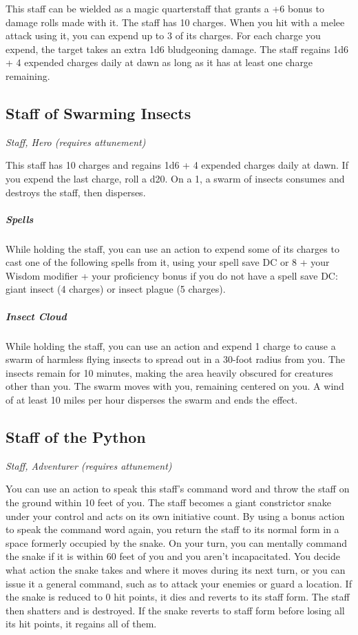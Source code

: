 This staff can be wielded as a magic quarterstaff that grants a +6 bonus to damage rolls made with it.  The staff has 10 charges. When you hit with a melee attack using it, you can expend up to 3 of its charges. For each charge you expend, the target takes an extra 1d6 bludgeoning damage. The staff regains 1d6 + 4 expended charges daily at dawn as long as it has at least one charge remaining.

\subsection{Staff of Swarming Insects}
\textit{Staff, Hero (requires attunement)}

This staff has 10 charges and regains 1d6 + 4 expended charges daily at dawn. If you expend the last charge, roll a d20. On a 1, a swarm of insects consumes and destroys the staff, then disperses.

\subparagraph*{Spells} While holding the staff, you can use an action to expend some of its charges to cast one of the following spells from it, using your spell save DC or 8 + your Wisdom modifier + your proficiency bonus if you do not have a spell save DC: giant insect (4 charges) or insect plague (5 charges).

\subparagraph*{Insect Cloud} While holding the staff, you can use an action and expend 1 charge to cause a swarm of harmless flying insects to spread out in a 30-foot radius from you. The insects remain for 10 minutes, making the area heavily obscured for creatures other than you. The swarm moves with you, remaining centered on you. A wind of at least 10 miles per hour disperses the swarm and ends the effect.

\subsection{Staff of the Python}
\textit{Staff, Adventurer (requires attunement)}

You can use an action to speak this staff's command word and throw the staff on the ground within 10 feet of you. The staff becomes a giant constrictor snake under your control and acts on its own initiative count. By using a bonus action to speak the command word again, you return the staff to its normal form in a space formerly occupied by the snake.  On your turn, you can mentally command the snake if it is within 60 feet of you and you aren't incapacitated. You decide what action the snake takes and where it moves during its next turn, or you can issue it a general command, such as to attack your enemies or guard a location.  If the snake is reduced to 0 hit points, it dies and reverts to its staff form. The staff then shatters and is destroyed. If the snake reverts to staff form before losing all its hit points, it regains all of them.


